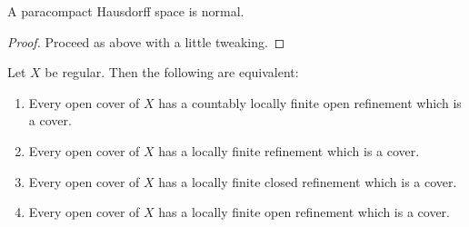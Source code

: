 \begin{proposition}
    A paracompact Hausdorff space is normal.
\end{proposition}
\begin{proof}
    Proceed as above with a little tweaking.
\end{proof}

\begin{lemma}
    Let $X$ be regular. Then the following are equivalent: 
    \begin{enumerate}[label=(\alph*)]
        \item Every open cover of $X$ has a countably locally finite open refinement which is a cover.
        \item Every open cover of $X$ has a locally finite refinement which is a cover.
        \item Every open cover of $X$ has a locally finite closed refinement which is a cover.
        \item Every open cover of $X$ has a locally finite open refinement which is a cover.
    \end{enumerate}
\end{lemma}
